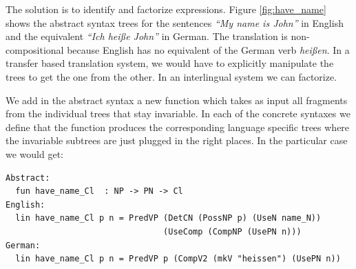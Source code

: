 \documentclass[output=paper]{LSP/langsci}
\begin{document}
The solution is to identify and factorize expressions. 
Figure \ref{fig:have_name} shows the abstract syntax trees for 
the sentences \textit{“My name is John”} in English and 
the equivalent \textit{“Ich hei{\ss}e John”} in German. 
The translation is non-compositional because English has 
no equivalent of the German verb \textit{hei{\ss}en}. 
In a transfer based translation system, we would have to explicitly 
manipulate the trees to get the one from the other. 
In an interlingual system we can factorize. 

We add in the abstract syntax a new function which takes as input 
all fragments from the individual trees that stay invariable. 
In each of the concrete syntaxes we define that the function produces 
the corresponding language specific trees where the invariable subtrees 
are just plugged in the right places. In the particular case we would get:
\begin{verbatim}
Abstract:
  fun have_name_Cl  : NP -> PN -> Cl
English:
  lin have_name_Cl p n = PredVP (DetCN (PossNP p) (UseN name_N))
                                (UseComp (CompNP (UsePN n)))
German:
  lin have_name_Cl p n = PredVP p (CompV2 (mkV "heissen") (UsePN n))
\end{verbatim}
\end{document}
